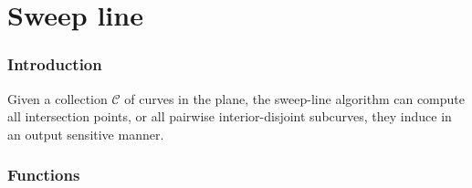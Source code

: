 \chapter{Sweep line}

\subsection*{Introduction}

Given a collection ${\mathcal C}$ of curves in the plane, the sweep-line
algorithm can compute all intersection points, or all pairwise interior-disjoint
subcurves, they induce in an output sensitive manner.

\subsection*{Functions}

\\
\\
